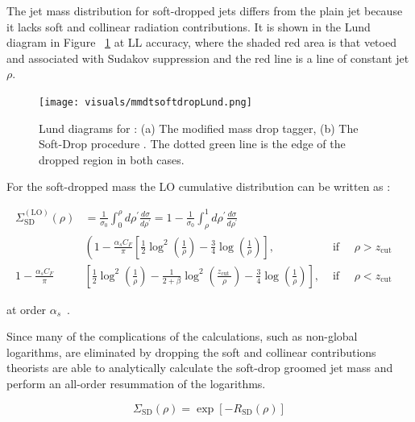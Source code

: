 The jet mass distribution for soft-dropped jets differs from the plain jet because it lacks soft and collinear radiation contributions. It is shown in the Lund diagram in Figure ~\ref{fig:mmdtsoftdropLund} at LL accuracy, where the shaded red area is that vetoed and associated with Sudakov suppression and the red line is a line of constant jet $\rho$.

\begin{figure}[htb]
\centering
\texttt{[image: visuals/mmdtsoftdropLund.png]}
\caption{Lund diagrams for : (a) The modified mass drop tagger, (b) The Soft-Drop procedure . The dotted green line is the edge of the dropped region in both cases. }
\label{fig:mmdtsoftdropLund}
\end{figure}

For the soft-dropped mass the LO cumulative distribution can be written as :\newline

\begin{equation}
\begin{aligned} \Sigma_{\mathrm{SD}}^{(\mathrm{LO})}(\rho) &=\frac{1}{\sigma_{0}} \int_{0}^{\rho} d \rho^{\prime} \frac{d \sigma}{d \rho^{\prime}}=1-\frac{1}{\sigma_{0}} \int_{\rho}^{1} d \rho^{\prime} \frac{d \sigma}{d \rho^{\prime}} & & \\ &\left(1-\frac{\alpha_{s} C_{F}}{\pi}\left[\frac{1}{2} \log ^{2}\left(\frac{1}{\rho}\right)-\frac{3}{4} \log \left(\frac{1}{\rho}\right)\right],\right.& \text { if } \quad \rho>z_{\mathrm{cut}} \\ 1-\frac{\alpha_{s} C_{F}}{\pi} &\left[\frac{1}{2} \log ^{2}\left(\frac{1}{\rho}\right)-\frac{1}{2+\beta} \log ^{2}\left(\frac{z_{\text {cut }}}{\rho}\right)-\frac{3}{4} \log \left(\frac{1}{\rho}\right)\right], & \text { if } \quad \rho<z_{\text {cut }} \end{aligned}
\end{equation}

at order $\alpha_s$~\cite{Marzani:2019hun}.

Since many of the complications of the calculations, such as non-global logarithms, are eliminated by dropping the soft and collinear contributions theorists are able to analytically calculate the soft-drop groomed jet mass and perform an all-order resummation of the logarithms.

\begin{equation}
\Sigma_{\mathrm{SD}}(\rho)=\exp \left[-R_{\mathrm{SD}}(\rho)\right]
\end{equation}



